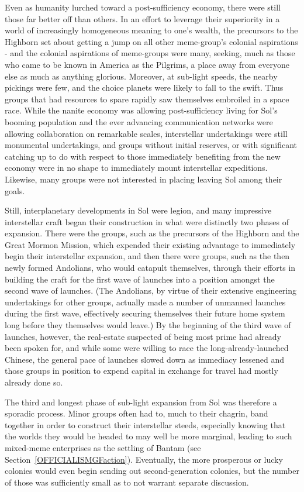 Even as humanity lurched toward a post-sufficiency economy, there were
still those far better off than others. In an effort to leverage their
superiority in a world of increasingly homogeneous meaning to one's
wealth, the precursors to the Highborn set about getting a jump on all
other meme-group's colonial aspirations - and the colonial aspirations
of meme-groups were many, seeking, much as those who came to be known
in America as the Pilgrims, a place away from everyone else as much as
anything glorious. Moreover, at sub-light speeds, the nearby pickings
were few, and the choice planets were likely to fall to the
swift. Thus groups that had resources to spare rapidly saw themselves
embroiled in a space race. While the nanite economy was allowing
post-sufficiency living for Sol's booming population and the ever
advancing communication networks were allowing collaboration on
remarkable scales, interstellar undertakings were still monumental
undertakings, and groups without initial reserves, or with significant
catching up to do with respect to those immediately benefiting from
the new economy were in no shape to immediately mount interstellar
expeditions. Likewise, many groups were not interested in placing
leaving Sol among their goals.

Still, interplanetary developments in Sol were legion, and many
impressive interstellar craft began their construction in what were
distinctly two phases of expansion. There were the groups, such as the
precursors of the Highborn and the Great Mormon Mission, which
expended their existing advantage to immediately begin their
interstellar expansion, and then there were groups, such as the then
newly formed Andolians, who would catapult themselves, through their
efforts in building the craft for the first wave of launches into a
position amongst the second wave of launches. (The Andolians, by
virtue of their extensive engineering undertakings for other groups,
actually made a number of unmanned launches during the first wave,
effectively securing themselves their future home system long before
they themselves would leave.) By the beginning of the third wave of
launches, however, the real-estate suspected of being most prime had
already been spoken for, and while some were willing to race the
long-already-launched Chinese, the general pace of launches slowed
down as immediacy lessened and those groups in position to expend
capital in exchange for travel had mostly already done so.

The third and longest phase of sub-light expansion from Sol was
therefore a sporadic process. Minor groups often had to, much to their
chagrin, band together in order to construct their interstellar
steeds, especially knowing that the worlds they would be headed to may
well be more marginal, leading to such mixed-meme enterprises as the
settling of Bantam (see Section~\ref{OFFICIALISMGFaction}). Eventually, the
more prosperous or lucky colonies would even begin sending out
second-generation colonies, but the number of those was sufficiently
small as to not warrant separate discussion.

